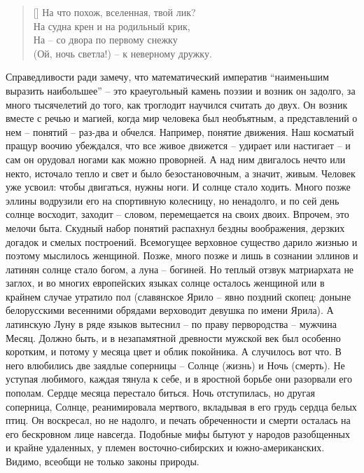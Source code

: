 \documentclass[12pt,a5paper,twoside]{article}
\begin{document}
\settowidth{\versewidth}{На что похож, вселенная, твой лик?}
\begin{verse}[\versewidth]
На что похож, вселенная, твой лик?\\
На судна крен и на родильный крик,\\
На -- со двора по первому снежку\\
(Ой, ночь светла!) -- к неверному дружку.
\end{verse}

Справедливости ради замечу, что математический императив ``наименьшим выразить наибольшее'' -- 
это краеугольный камень поэзии и возник он задолго, за много тысячелетий до того, как 
троглодит научился считать до двух. Он возник вместе с речью и магией, когда мир 
человека был необъятным, а представлений о нем -- понятий -- раз-два и обчелся. 
Например, понятие движения. Наш косматый пращур воочию убеждался, что все живое движется -- удирает 
или настигает -- и сам он орудовал ногами как можно проворней. А над ним двигалось нечто или 
некто, источало тепло и свет и было безостановочным, а значит, живым. Человек уже усвоил: 
чтобы двигаться, нужны ноги. И солнце стало ходить. Много позже эллины водрузили его на спортивную 
колесницу, но ненадолго, и по сей день солнце восходит, заходит -- словом, перемещается на 
своих двоих. Впрочем, это мелочи быта. Скудный набор понятий распахнул бездны воображения, дерзких 
догадок и смелых построений. Всемогущее верховное существо дарило жизнью и поэтому мыслилось женщиной. 
Позже, много позже и лишь в сознании эллинов и латинян солнце стало богом, а луна -- богиней. Но теплый 
отзвук матриархата не заглох, и во многих европейских языках солнце осталось женщиной или в крайнем 
случае утратило пол (славянское Ярило -- явно поздний скопец: доныне белорусскими весенними обрядами 
верховодит девушка по имени Ярила). А латинскую Луну в ряде языков вытеснил -- по праву первородства -- мужчина 
Месяц. Должно быть, и в незапамятной древности мужской век был особенно коротким, и потому у 
месяца цвет и облик покойника. А случилось вот что. В него влюбились две заядлые соперницы -- Солнце 
(жизнь) и Ночь (смерть). Не уступая любимого, каждая тянула к себе, и в яростной борьбе они 
разорвали его пополам. Сердце месяца перестало биться. Ночь отступилась, но другая соперница, Солнце, 
реанимировала мертвого, вкладывая в его грудь сердца белых птиц. Он воскресал, но не надолго, и 
печать обреченности и смерти осталась на его бескровном лице навсегда. Подобные мифы бытуют у народов 
разобщенных и крайне удаленных, у племен восточно-сибирских и южно-американских. Видимо, всеобщи не только законы природы.
\end{document}
